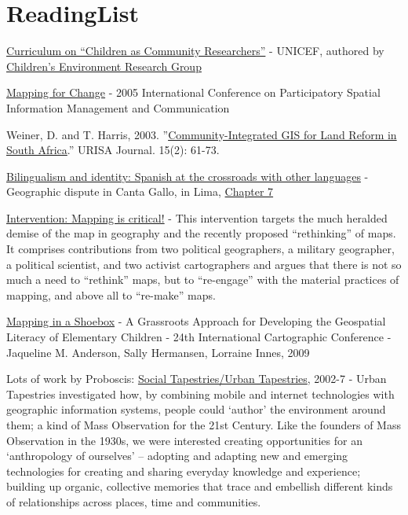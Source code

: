 \documentclass[11pt]{report}
\begin{document}
\chapter{ReadingList}

\href{http://www.unicef.org/teachers/researchers/intro.htm}{Curriculum on ``{}Children as Community Researchers''{}} - UNICEF, authored by \href{http://web.gc.cuny.edu/che/cerg/about_cerg/environmental_learning_index.htm}{Children'{}s Environment Research Group}

\href{http://www.iapad.org/pgis2005/}{Mapping for Change} - 2005 International Conference on Participatory Spatial Information Management and Communication

Weiner, D. and T. Harris, 2003. ''{}\href{http://www.rri.wvu.edu/pdffiles/gisweiner.pdf}{Community-Integrated GIS for Land Reform in South Africa}.''{} URISA Journal. 15(2): 61-73.

\href{http://books.google.com/books?hl=en&lr=&id=_VK-ABCKlVgC&oi=fnd&pg=PA3&dq=Nino+Bariola&ots=_r1wMwjiou&sig=TH0Gn1P27Xtsdq2Oc0Up5D6HLzg#v=onepage&q=Nino%20Bariola&f=false}{Bilingualism and identity: Spanish at the crossroads with other languages} - Geographic dispute in Canta Gallo, in Lima, \href{http://books.google.com/books?id=_VK-ABCKlVgC&lpg=PA3&ots=_r1wMwjiou&dq=Nino%20Bariola&lr=&pg=PA153#v=onepage&q=&f=true}{Chapter 7}

\href{http://www.sciencedirect.com/science?_ob=ArticleURL&_udi=B6VG2-4XHJX4B-1&_user=10&_coverDate=08/31/2009&_rdoc=1&_fmt=high&_orig=search&_sort=d&_docanchor=&view=c&_searchStrId=1186930669&_rerunOrigin=google&_acct=C000050221&_version=1&_urlVersion=0&_userid=10&md5=a9327ffa62e089e863f892a4551c1717}{Intervention: Mapping is critical!} - This intervention targets the much heralded demise of the map in geography and the recently proposed “rethinking” of maps. It comprises contributions from two political geographers, a military geographer, a political scientist, and two activist cartographers and argues that there is not so much a need to “rethink” maps, but to “re-engage” with the material practices of mapping, and above all to “re-make” maps.

\href{http://training.esri.com/campus/library/bibliography/RecordDetail.cfm?ID=95545&browseonly=0}{Mapping in a Shoebox} - A Grassroots Approach for Developing the Geospatial Literacy of Elementary Children - 24th International Cartographic Conference - Jaqueline M. Anderson, Sally Hermansen, Lorraine Innes, 2009

Lots of work by Proboscis: \href{http://urbantapestries.net/}{Social Tapestries/Urban Tapestries}, 2002-7 - Urban Tapestries investigated how, by combining mobile and internet technologies with geographic information systems, people could `author' the environment around them; a kind of Mass Observation for the 21st Century. Like the founders of Mass Observation in the 1930s, we were interested creating opportunities for an `anthropology of ourselves' – adopting and adapting new and emerging technologies for creating and sharing everyday knowledge and experience; building up organic, collective memories that trace and embellish different kinds of relationships across places, time and communities.
\end{document}
